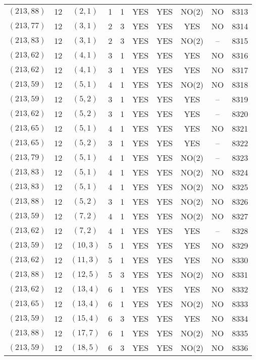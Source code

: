 \begin{longtable}{|c|c|c|c|c|c|c|c|c|c|}
$(213, 88)$ & 12 & $(2, 1)$ & 1 & 1 & YES & YES & NO(2) & NO & 8313\\
$(213, 77)$ & 12 & $(3, 1)$ & 2 & 3 & YES & YES & YES & NO & 8314\\
$(213, 83)$ & 12 & $(3, 1)$ & 2 & 3 & YES & YES & NO(2) & -- & 8315\\
$(213, 62)$ & 12 & $(4, 1)$ & 3 & 1 & YES & YES & YES & NO & 8316\\
$(213, 62)$ & 12 & $(4, 1)$ & 3 & 1 & YES & YES & YES & NO & 8317\\
$(213, 59)$ & 12 & $(5, 1)$ & 4 & 1 & YES & YES & NO(2) & NO & 8318\\
$(213, 59)$ & 12 & $(5, 2)$ & 3 & 1 & YES & YES & YES & -- & 8319\\
$(213, 62)$ & 12 & $(5, 2)$ & 3 & 1 & YES & YES & YES & -- & 8320\\
$(213, 65)$ & 12 & $(5, 1)$ & 4 & 1 & YES & YES & YES & NO & 8321\\
$(213, 65)$ & 12 & $(5, 2)$ & 3 & 1 & YES & YES & YES & -- & 8322\\
$(213, 79)$ & 12 & $(5, 1)$ & 4 & 1 & YES & YES & NO(2) & -- & 8323\\
$(213, 83)$ & 12 & $(5, 1)$ & 4 & 1 & YES & YES & NO(2) & NO & 8324\\
$(213, 83)$ & 12 & $(5, 1)$ & 4 & 1 & YES & YES & NO(2) & NO & 8325\\
$(213, 88)$ & 12 & $(5, 2)$ & 3 & 1 & YES & YES & NO(2) & NO & 8326\\
$(213, 59)$ & 12 & $(7, 2)$ & 4 & 1 & YES & YES & NO(2) & NO & 8327\\
$(213, 62)$ & 12 & $(7, 2)$ & 4 & 1 & YES & YES & YES & -- & 8328\\
$(213, 59)$ & 12 & $(10, 3)$ & 5 & 1 & YES & YES & YES & NO & 8329\\
$(213, 62)$ & 12 & $(11, 3)$ & 5 & 1 & YES & YES & YES & NO & 8330\\
$(213, 88)$ & 12 & $(12, 5)$ & 5 & 3 & YES & YES & NO(2) & NO & 8331\\
$(213, 62)$ & 12 & $(13, 4)$ & 6 & 1 & YES & YES & YES & NO & 8332\\
$(213, 65)$ & 12 & $(13, 4)$ & 6 & 1 & YES & YES & NO(2) & NO & 8333\\
$(213, 59)$ & 12 & $(15, 4)$ & 6 & 3 & YES & YES & YES & NO & 8334\\
$(213, 88)$ & 12 & $(17, 7)$ & 6 & 1 & YES & YES & NO(2) & NO & 8335\\
$(213, 59)$ & 12 & $(18, 5)$ & 6 & 3 & YES & YES & NO(2) & NO & 8336\\

\end{longtable}
